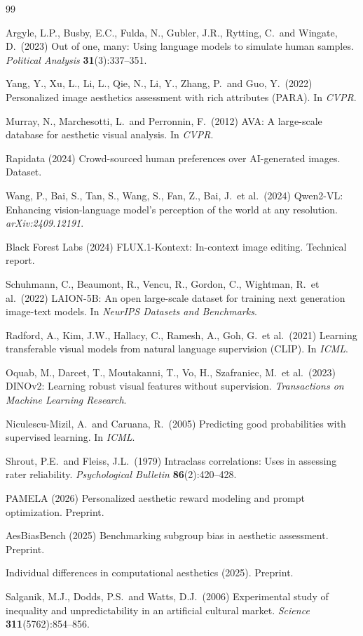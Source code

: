 \documentclass{article}
\begin{document}
\begingroup
\small
\begin{thebibliography}{99}

Argyle, L.P., Busby, E.C., Fulda, N., Gubler, J.R., Rytting, C.\ and Wingate, D.\ (2023)
Out of one, many: Using language models to simulate human samples. {\it Political Analysis} {\bf 31}(3):337--351.

Yang, Y., Xu, L., Li, L., Qie, N., Li, Y., Zhang, P.\ and Guo, Y.\ (2022)
Personalized image aesthetics assessment with rich attributes (PARA). In {\it CVPR}.

Murray, N., Marchesotti, L.\ and Perronnin, F.\ (2012)
AVA: A large-scale database for aesthetic visual analysis. In {\it CVPR}.

Rapidata (2024)
Crowd-sourced human preferences over AI-generated images. Dataset.

Wang, P., Bai, S., Tan, S., Wang, S., Fan, Z., Bai, J.\ et al.\ (2024)
Qwen2-VL: Enhancing vision-language model's perception of the world at any resolution. {\it arXiv:2409.12191}.

Black Forest Labs (2024)
FLUX.1-Kontext: In-context image editing. Technical report.

Schuhmann, C., Beaumont, R., Vencu, R., Gordon, C., Wightman, R.\ et al.\ (2022)
LAION-5B: An open large-scale dataset for training next generation image-text models. In {\it NeurIPS Datasets and Benchmarks}.

Radford, A., Kim, J.W., Hallacy, C., Ramesh, A., Goh, G.\ et al.\ (2021)
Learning transferable visual models from natural language supervision (CLIP). In {\it ICML}.

Oquab, M., Darcet, T., Moutakanni, T., Vo, H., Szafraniec, M.\ et al.\ (2023)
DINOv2: Learning robust visual features without supervision. {\it Transactions on Machine Learning Research}.

Niculescu-Mizil, A.\ and Caruana, R.\ (2005)
Predicting good probabilities with supervised learning. In {\it ICML}.

Shrout, P.E.\ and Fleiss, J.L.\ (1979)
Intraclass correlations: Uses in assessing rater reliability. {\it Psychological Bulletin} {\bf 86}(2):420--428.

PAMELA (2026)
Personalized aesthetic reward modeling and prompt optimization. Preprint.

AesBiasBench (2025)
Benchmarking subgroup bias in aesthetic assessment. Preprint.

Individual differences in computational aesthetics (2025). Preprint.

Salganik, M.J., Dodds, P.S.\ and Watts, D.J.\ (2006)
Experimental study of inequality and unpredictability in an artificial cultural market. {\it Science} {\bf 311}(5762):854--856.

\end{thebibliography}
\endgroup
\end{document}
